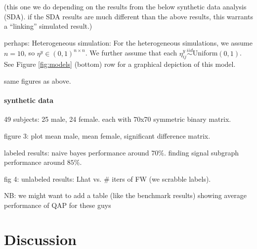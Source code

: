 (this one we do depending on the results from the below synthetic data analysis (SDA).  if the SDA results are much different than the above results, this warrants a ``linking'' simulated result.)

perhaps: Heterogeneous simulation: For the heterogeneous simulations, we assume $n=10$, so $\eta^y \in (0,1)^{n\times n}$.  We further assume that each $\eta_{ij}^y \overset{iid}{\sim}$Uniform$(0,1)$.  See Figure \ref{fig:models} (bottom) row for a graphical depiction of this model.

same figures as above.

\paragraph{synthetic data} %
\label{par:synthetic_data}

49 subjects: 25 male, 24 female.  each with 70x70 symmetric binary matrix.  

figure 3: plot mean male, mean female, significant difference matrix.

labeled results: naive bayes performance around $70\%$.  finding signal subgraph performance around $85\%$.  

fig 4: unlabeled results: Lhat vs. \# iters of FW (we scrabble labels).  

NB: we might want to add a table (like the benchmark results) showing average performance of QAP for these guys




\section{Discussion}




%

%


